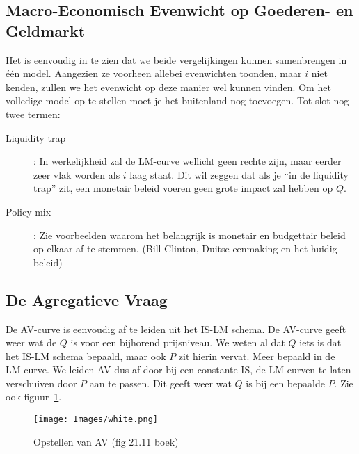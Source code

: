 \subsection{Macro-Economisch Evenwicht op Goederen- en Geldmarkt}
Het is eenvoudig in te zien dat we beide vergelijkingen kunnen samenbrengen in \'e\'en model. Aangezien ze voorheen allebei evenwichten toonden, maar $i$ niet kenden, zullen we het evenwicht op deze manier wel kunnen vinden. Om het volledige model op te stellen moet je het buitenland nog toevoegen. Tot slot nog twee termen:

\begin{description}
  \item[Liquidity trap]: In werkelijkheid zal de LM-curve wellicht geen rechte zijn, maar eerder zeer vlak worden als $i$ laag staat. Dit wil zeggen dat als je ``in de liquidity trap'' zit, een monetair beleid voeren geen grote impact zal hebben op $Q$.
  \item[Policy mix]: Zie voorbeelden waarom het belangrijk is monetair en budgettair beleid op elkaar af te stemmen. (Bill Clinton, Duitse eenmaking en het huidig beleid)
\end{description}

\subsection{De Agregatieve Vraag}
De AV-curve is eenvoudig af te leiden uit het IS-LM schema. De AV-curve geeft weer wat de $Q$ is voor een bijhorend prijsniveau. We weten al dat $Q$ iets is dat het IS-LM schema bepaald, maar ook $P$ zit hierin vervat. Meer bepaald in de LM-curve. We leiden AV dus af door bij een constante IS, de LM curven te laten verschuiven door $P$ aan te passen. Dit geeft weer wat $Q$ is bij een bepaalde $P$. Zie ook figuur~\ref{fig:opstellenAV}.

\begin{figure}[htbp]
	\centering
	\texttt{[image: Images/white.png]}
	\caption{Opstellen van AV (fig 21.11 boek)}
	\label{fig:opstellenAV}
\end{figure}
